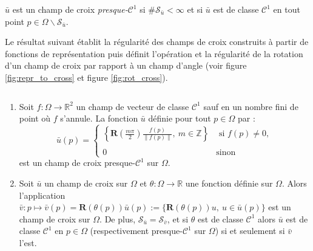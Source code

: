 \begin{definition}
    $\bar{u}$ est un champ de croix \emph{presque-$\mathcal{C}^1$} si $\#\mathcal{S}_{\bar{u}}<\infty$ et si $\bar{u}$ est de classe $\mathcal{C}^1$ en tout point $p\in\Omega\backslash\mathcal{S}_{\bar{u}}$.
\end{definition}


Le résultat suivant établit la régularité des champs de croix construits à partir de fonctions de représentation \cite{kowalski2013pde, viertel2019approach} puis définit l'opération et la régularité de la rotation d'un champ de croix par rapport à un champ d'angle (voir figure \ref{fig:repr_to_cross} et figure \ref{fig:rot_cross}).

\begin{proposition}
\label{prop:cont1}
\[\]
\vspace{-1cm}
\begin{enumerate}
\item Soit $f : \Omega \rightarrow \mathbb{R}^2$ un champ de vecteur de classe $\mathcal{C}^1$ sauf en un nombre fini de point où $f$ s'annule. La fonction $\bar{u}$ définie pour tout $p\in\Omega$ par :
\begin{equation}
    \bar{u}(p) =
\left\{
    \begin{array}{lc}
        \displaystyle\left\{\mathbf{R}\left(\frac{m\pi}{2}\right)\frac{f(p)}{\left\|f(p)\right\|},~ m\in \mathbb{Z}\right\} &\text{ si }f(p)\neq 0,\\\\
        0& \text{sinon}
    \end{array}
\right.
\label{eq:repr_to_cross}
\end{equation}
est un champ de croix presque-$\mathcal{C}^1$ sur $\Omega$.

\item Soit $\bar{u}$ un champ de croix sur $\Omega$ et $\theta : \Omega \rightarrow \mathbb{R}$ une fonction définie sur $\Omega$. Alors l'application $\bar{v}:p\mapsto \bar{v}(p)=\mathbf{R}(\theta(p))\bar{u}(p):=\{\mathbf{R}(\theta(p)) u,~u\in \bar{u}(p)\}$ est un champ de croix sur $\Omega$. De plus, $\mathcal{S}_{\bar{u}}=\mathcal{S}_{\bar{v}}$, et si $\theta$ est de classe $\mathcal{C}^1$ alors $\bar{u}$ est de classe $\mathcal{C}^1$ en $p\in \Omega$ (respectivement presque-$\mathcal{C}^1$ sur $\Omega$) si et seulement si $\bar{v}$ l'est.
\end{enumerate}
\end{proposition}

